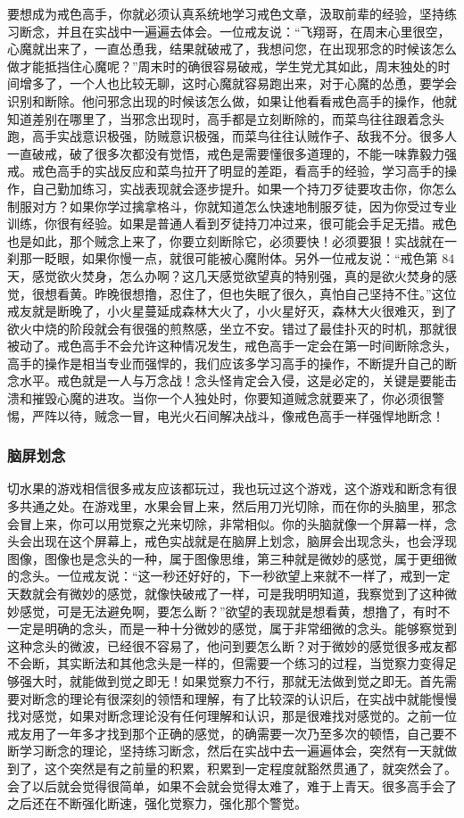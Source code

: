 要想成为戒色高手，你就必须认真系统地学习戒色文章，汲取前辈的经验，坚持练习断念，并且在实战中一遍遍去体会。一位戒友说：“飞翔哥，在周末心里很空，心魔就出来了，一直怂恿我，结果就破戒了，我想问您，在出现邪念的时候该怎么做才能抵挡住心魔呢？”周末时的确很容易破戒，学生党尤其如此，周末独处的时间增多了，一个人也比较无聊，这时心魔就容易跑出来，对于心魔的怂恿，要学会识别和断除。他问邪念出现的时候该怎么做，如果让他看看戒色高手的操作，他就知道差别在哪里了，当邪念出现时，高手都是立刻断除的，而菜鸟往往跟着念头跑，高手实战意识极强，防贼意识极强，而菜鸟往往认贼作子、敌我不分。很多人一直破戒，破了很多次都没有觉悟，戒色是需要懂很多道理的，不能一味靠毅力强戒。戒色高手的实战反应和菜鸟拉开了明显的差距，看高手的经验，学习高手的操作，自己勤加练习，实战表现就会逐步提升。如果一个持刀歹徒要攻击你，你怎么制服对方？如果你学过擒拿格斗，你就知道怎么快速地制服歹徒，因为你受过专业训练，你很有经验。如果是普通人看到歹徒持刀冲过来，很可能会手足无措。戒色也是如此，那个贼念上来了，你要立刻断除它，必须要快！必须要狠！实战就在一刹那一眨眼，如果你慢一点，就很可能被心魔附体。另外一位戒友说：“戒色第 84 天，感觉欲火焚身，怎么办啊？这几天感觉欲望真的特别强，真的是欲火焚身的感觉，很想看黄。昨晚很想撸，忍住了，但也失眠了很久，真怕自己坚持不住。”这位戒友就是断晚了，小火星蔓延成森林大火了，小火星好灭，森林大火很难灭，到了欲火中烧的阶段就会有很强的煎熬感，坐立不安。错过了最佳扑灭的时机，那就很被动了。戒色高手不会允许这种情况发生，戒色高手一定会在第一时间断除念头，高手的操作是相当专业而强悍的，我们应该多学习高手的操作，不断提升自己的断念水平。戒色就是一人与万念战！念头怪肯定会入侵，这是必定的，关键是要能击溃和摧毁心魔的进攻。当你一个人独处时，你要知道贼念就要来了，你必须很警惕，严阵以待，贼念一冒，电光火石间解决战斗，像戒色高手一样强悍地断念！

\subsubsection{脑屏划念}

切水果的游戏相信很多戒友应该都玩过，我也玩过这个游戏，这个游戏和断念有很多共通之处。在游戏里，水果会冒上来，然后用刀光切除，而在你的头脑里，邪念会冒上来，你可以用觉察之光来切除，非常相似。你的头脑就像一个屏幕一样，念头会出现在这个屏幕上，戒色实战就是在脑屏上划念，脑屏会出现念头，也会浮现图像，图像也是念头的一种，属于图像思维，第三种就是微妙的感觉，属于更细微的念头。一位戒友说：“这一秒还好好的，下一秒欲望上来就不一样了，戒到一定天数就会有微妙的感觉，就像快破戒了一样，可是我明明知道，我察觉到了这种微妙感觉，可是无法避免啊，要怎么断？”欲望的表现就是想看黄，想撸了，有时不一定是明确的念头，而是一种十分微妙的感觉，属于非常细微的念头。能够察觉到这种念头的微波，已经很不容易了，他问到要怎么断？对于微妙的感觉很多戒友都不会断，其实断法和其他念头是一样的，但需要一个练习的过程，当觉察力变得足够强大时，就能做到觉之即无！如果觉察力不行，那就无法做到觉之即无。首先需要对断念的理论有很深刻的领悟和理解，有了比较深的认识后，在实战中就能慢慢找对感觉，如果对断念理论没有任何理解和认识，那是很难找对感觉的。之前一位戒友用了一年多才找到那个正确的感觉，的确需要一次乃至多次的顿悟，自己要不断学习断念的理论，坚持练习断念，然后在实战中去一遍遍体会，突然有一天就做到了，这个突然是有之前量的积累，积累到一定程度就豁然贯通了，就突然会了。会了以后就会觉得很简单，如果不会就会觉得太难了，难于上青天。很多高手会了之后还在不断强化断速，强化觉察力，强化那个警觉。

